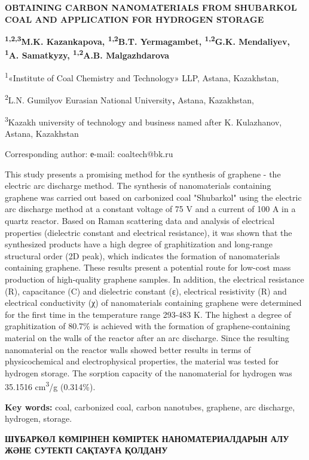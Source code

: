 {\bfseries OBTAINING CARBON NANOMATERIALS FROM SHUBARKOL COAL AND
APPLICATION FOR HYDROGEN STORAGE}

{\bfseries \textsuperscript{1,2,3}M.K. Kazankapova,
\textsuperscript{1,2}B.T. Yermagambet, \textsuperscript{1,2}G.K.
Mendaliyev, \textsuperscript{1}A. Samatkyzy, \textsuperscript{1,2}A.B.
Malgazhdarova}

\textsuperscript{1}«Institute of Coal Chemistry and Technology» LLP,
Astana, Kazakhstan,

\textsuperscript{2}L.N. Gumilyov Eurasian National University{\bfseries ,}
Astana, Kazakhstan,

\textsuperscript{3}Kazakh university of technology and business named
after K. Kulazhanov, Astana, Kazakhstan

Corresponding author: е-mail: coaltech@bk.ru

This study presents a promising method for the synthesis of graphene -
the electric arc discharge method. The synthesis of nanomaterials
containing graphene was carried out based on carbonized coal "Shubarkol"
using the electric arc discharge method at a constant voltage of 75 V
and a current of 100 A in a quartz reactor. Based on Raman scattering
data and analysis of electrical properties (dielectric constant and
electrical resistance), it was shown that the synthesized products have
a high degree of graphitization and long-range structural order (2D
peak), which indicates the formation of nanomaterials containing
graphene. These results present a potential route for low-cost mass
production of high-quality graphene samples. In addition, the electrical
resistance (R), capacitance (C) and dielectric constant (ε), electrical
resistivity (R) and electrical conductivity (χ) of nanomaterials
containing graphene were determined for the first time in the
temperature range 293-483 K. The highest a degree of graphitization of
80.7\% is achieved with the formation of graphene-containing material on
the walls of the reactor after an arc discharge. Since the resulting
nanomaterial on the reactor walls showed better results in terms of
physicochemical and electrophysical properties, the material was tested
for hydrogen storage. The sorption capacity of the nanomaterial for
hydrogen was 35.1516 cm\textsuperscript{3}/g (0.314\%).

{\bfseries Key words:} coal, carbonized coal, carbon nanotubes, graphene,
arc discharge, hydrogen, storage.

{\bfseries ШҰБАРКӨЛ КӨМІРІНЕН КӨМІРТЕК НАНОМАТЕРИАЛДАРЫН АЛУ ЖӘНЕ СУТЕКТІ
САҚТАУҒА ҚОЛДАНУ}

